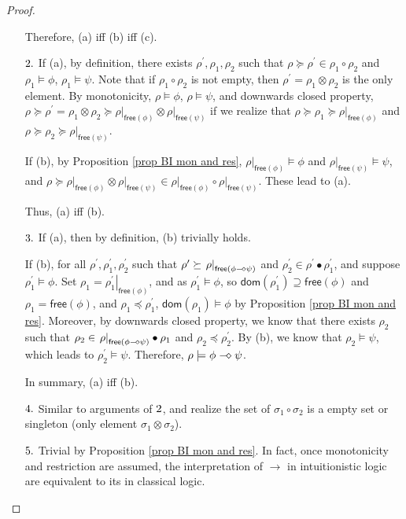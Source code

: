 \documentclass[conference,compsoc, 10pt]{IEEEtran}
\newcommand {\Ldom }[1] {{\mathsf{dom}\!\left(#1\right)}}
\newcommand {\Lfree }[1] {{\mathsf{free}{\left(#1\right)}}}
\newcommand {\rt }[2] {{\left.{#1}\right|_{#2}}}
\newcommand {\sdimp} {\mathrel{-\mkern-2.5mu\diamond}}
\begin{document}
\begin{appendices}
\begin{proof}
\begin{enumerate}
				Therefore, (a) iff (b) iff (c).
				
				\item[${\rm 2.}$] If (a), by definition, there exists $\rho^\prime,\rho_1,\rho_2$ such that $\rho\succeq\rho^\prime\in\rho_1\circ\rho_2$ and $\rho_1\models\phi$, $\rho_1\models\psi$. Note that if $\rho_1\circ\rho_2$ is not empty, then $\rho^\prime=\rho_1\otimes\rho_2$ is the only element. By monotonicity, $\rho\models\phi$, $\rho\models\psi$, and downwards closed property, $\rho\succeq\rho^\prime=\rho_1\otimes\rho_2\succeq\rt{\rho}{\Lfree{\phi}}\otimes\rt{\rho}{\Lfree{\psi}}$ if we realize that $\rho\succeq\rho_1\succeq\rt{\rho}{\Lfree{\phi}}$ and $\rho\succeq\rho_2\succeq\rt{\rho}{\Lfree{\psi}}$.
				
				If (b), by Proposition \ref{prop BI mon and res}, $\rt{\rho}{\Lfree{\phi}}\models\phi$ and $\rt{\rho}{\Lfree{\psi}}\models\psi$, and $\rho\succeq\rt{\rho}{\Lfree{\phi}}\otimes\rt{\rho}{\Lfree{\psi}} \in \rt{\rho}{\Lfree{\phi}}\circ\rt{\rho}{\Lfree{\psi}}$. These lead to (a).
				
				Thus, (a) iff (b).
				
				\item[${\rm 3.}$] If (a), then by definition, (b) trivially holds.
				
				If (b), for all $\rho^\prime,\rho_1^\prime, \rho_2^\prime$ such that $\rho^\prime\succeq\rt{\rho}{\Lfree{\phi\sdimp\psi}}$ and $\rho_2^\prime\in\rho^\prime\bullet\rho_1^\prime$, and suppose $\rho_1^\prime\models\phi$. Set $\rho_1 = \rt{\rho_1^\prime}{\Lfree{\phi}}$, and as $\rho_1^\prime\models\phi$, so $\Ldom{\rho_1^\prime}\supseteq\Lfree{\phi}$ and $\rho_1 = \Lfree{\phi}$, and $\rho_1\preceq\rho_1^\prime$, $\Ldom{\rho_1}\models\phi$ by Proposition \ref{prop BI mon and res}. Moreover, by downwards closed property, we know that there exists $\rho_2$ such that $\rho_2\in \rt{\rho}{\Lfree{\phi\sdimp\psi}}\bullet\rho_1$ and $\rho_2\preceq\rho_2^\prime$. By (b), we know that $\rho_2\models\psi$, which leads to $\rho_2^\prime\models\psi$. Therefore, $\rho\models\phi\sdimp\psi$.
				
				In summary, (a) iff (b).
				\item[${\rm 4.}$] Similar to arguments of ${\rm 2}$, and realize the set of $\sigma_1\circ\sigma_2$ is a empty set or singleton (only element $\sigma_1\otimes\sigma_2$).
				
				\item[${\rm 5.}$] Trivial by Proposition \ref{prop BI mon and res}. In fact, once monotonicity and restriction are assumed, the interpretation of $\rightarrow$ in intuitionistic logic are equivalent to its in classical logic.
			\end{enumerate}
		\end{proof}
		

\end{appendices}
\end{document}
